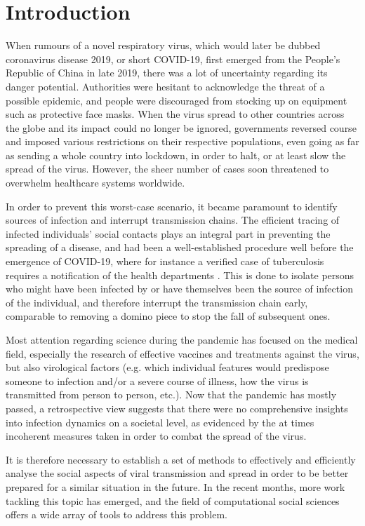 \chapter{Introduction}
\label{ch:Introduction}

When rumours of a novel respiratory virus, which would later be dubbed coronavirus disease 2019, or short COVID-19, first emerged from the People's Republic of China in late 2019, there was a lot of uncertainty regarding its danger potential. Authorities were hesitant to acknowledge the threat of a possible epidemic, and people were discouraged from stocking up on equipment such as protective face masks. When the virus spread to other countries across the globe and its impact could no longer be ignored, governments reversed course and imposed various restrictions on their respective populations, even going as far as sending a whole country into lockdown, in order to halt, or at least slow the spread of the virus. However, the sheer number of cases soon threatened to overwhelm healthcare systems worldwide.

In order to prevent this worst-case scenario, it became paramount to identify sources of infection and interrupt transmission chains. The efficient tracing of infected individuals' social contacts plays an integral part in preventing the spreading of a disease, and had been a well-established procedure well before the emergence of COVID-19, where for instance a verified case of tuberculosis requires a notification of the health departments \cite{enwiki_1097839709}. This is done to isolate persons who might have been infected by or have themselves been the source of infection of the individual, and therefore interrupt the transmission chain early, comparable to removing a domino piece to stop the fall of subsequent ones.

Most attention regarding science during the pandemic has focused on the medical field, especially the research of effective vaccines and treatments against the virus, but also virological factors (e.g. which individual features would predispose someone to infection and/or a severe course of illness, how the virus is transmitted from person to person, etc.). Now that the pandemic has mostly passed, a retrospective view suggests that there were no comprehensive insights into infection dynamics on a societal level, as evidenced by the at times incoherent measures taken in order to combat the spread of the virus.

It is therefore necessary to establish a set of methods to effectively and efficiently analyse the social aspects of viral transmission and spread in order to be better prepared for a similar situation in the future. In the recent months, more work tackling this topic has emerged, and the field of computational social sciences offers a wide array of tools to address this problem.

